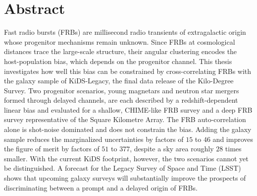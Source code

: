 \thispagestyle{plain}

\section*{Abstract}
Fast radio bursts (FRBs) are millisecond radio transients of extragalactic origin whose
progenitor mechanisms remain unknown. Since FRBs at cosmological distances trace the large-scale
structure, their angular clustering encodes the host-population bias, which depends
on the progenitor channel. This thesis investigates
how well this bias can be constrained by cross-correlating FRBs with the galaxy sample of
KiDS-Legacy, the final data release of the Kilo-Degree Survey. Two progenitor scenarios, young
magnetars and neutron star mergers formed through delayed channels, are each described by a
redshift-dependent linear bias and evaluated for a shallow, CHIME-like FRB survey and a deep FRB
survey representative of the Square Kilometre Array. The FRB auto-correlation alone is
shot-noise dominated and does not constrain the bias. Adding the galaxy sample reduces
the marginalized uncertainties by factors of $15$ to $46$ and improves the figure of merit by factors
of $51$ to $377$, despite a sky area roughly $28$ times smaller. With the current KiDS footprint,
however, the two scenarios cannot yet be distinguished. A forecast for the Legacy Survey of
Space and Time (LSST) shows that upcoming galaxy surveys will substantially improve the prospects of
discriminating between a prompt and a delayed origin of FRBs.

